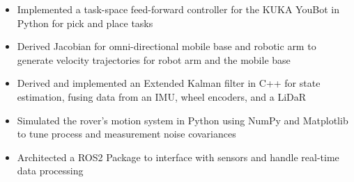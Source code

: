 \documentclass[10pt,a4paper,ragged2e,withhyper]{altacv}
\begin{document}
    \begin{itemize}
        \item Implemented a task-space feed-forward controller for the KUKA YouBot in Python for pick and place tasks
        \item Derived Jacobian for omni-directional mobile base and robotic arm to generate velocity trajectories for robot arm and the mobile base
    \end{itemize}
    \begin{itemize}
        \item Derived and implemented an Extended Kalman filter in C++ for state estimation, fusing data from an IMU, wheel encoders, and a LiDaR
        \item Simulated the rover's motion system in Python using NumPy and Matplotlib to tune process and measurement noise covariances
        \item Architected a ROS2 Package to interface with sensors and handle real-time data processing
    \end{itemize}
\end{document}
